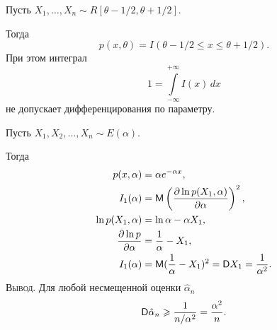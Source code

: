 \begin{ex}
  Пусть $X_1, \dots, X_n \sim R[\theta-1/2, \theta+1/2]$.

	Тогда
	\[
		p(x, \theta) = I(\theta-1/2 \leqslant x \leqslant \theta+1/2).
	\]
При этом интеграл
\[
	1 = \int\limits_{-\infty}^{+\infty} I(x) \, dx
\]
не допускает дифференцирования по параметру.
\end{ex}

\begin{ex}
	Пусть  $X_1, X_2, \dots, X_n \sim E(\alpha)$.

	Тогда
	\begin{align*}
		p(x, \alpha) &= \alpha e^{-\alpha x},\\
		I_1(\alpha) &= \mathsf M \left(\frac{\partial\ln p(X_1, \alpha)}{\partial\alpha}\right)^2,\\
		\ln p(X_1, \alpha) &= \ln \alpha - \alpha X_1,\\
		\frac{\partial \ln p}{\partial\alpha} &= \frac{1}{\alpha} - X_1,\\
		I_1(\alpha) &= \mathsf M (\frac{1}{\alpha} - X_1)^2 = \mathsf D X_1 = \dfrac{1}{\alpha^2}.
\end{align*}
\textsc{Вывод}. Для любой несмещенной оценки $\hat\alpha_n$
\[
	\mathsf D \hat\alpha_n \geqslant \frac{1}{n/\alpha^2} = \frac{\alpha^2}{n}.
\]
\end{ex}


